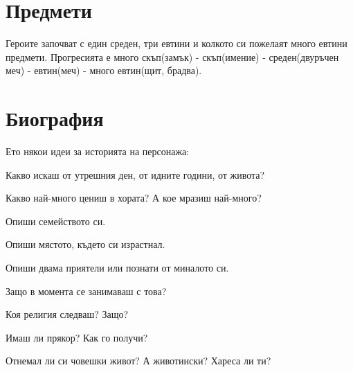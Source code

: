 \section{Предмети}
Героите започват с един среден, три евтини и колкото си пожелаят много евтини предмети.
Прогресията е много скъп(замък) - скъп(имение) - среден(двуръчен меч) - евтин(меч) - много евтин(щит, брадва).

\section{Биография}
Ето някои идеи за историята на персонажа:
\begin{itemize*}
\item{Какво искаш от утрешния ден, от идните години, от живота?}
\item{Какво най-много цениш в хората? А кое мразиш най-много?}
\item{Опиши семейството си.}
\item{Опиши мястото, където си израстнал.}
\item{Опиши двама приятели или познати от миналото си.}
\item{Защо в момента се занимаваш с това?}
\item{Коя религия следваш? Защо?}
\item{Имаш ли прякор? Как го получи?}
\item{Отнемал ли си човешки живот? А животински? Хареса ли ти?}
\end{itemize*}
